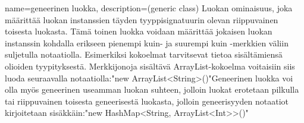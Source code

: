 {
	name=geneerinen luokka,
	description={(generic class) Luokan ominaisuus, joka määrittää luokan instanssien täyden
tyyppisignatuurin olevan riippuvainen toisesta luokasta. Tämä toinen luokka voidaan määrittää
jokaisen luokan instanssin kohdalla erikseen pienempi kuin- ja suurempi kuin -merkkien väliin
suljetulla notaatiolla. Esimerkiksi kokoelmat tarvitsevat tietoa sisältämiensä olioiden
tyypityksestä. Merkkijonoja sisältävä ArrayList-kokoelma voitaisiin siis luoda seuraavalla 
notaatiolla:\newline{}"new ArrayList<String>()"\newline{}Geneerinen luokka voi olla myös geneerinen useamman luokan suhteen, jolloin luokat erotetaan pilkulla tai riippuvainen toisesta
geneerisestä luokasta, jolloin geneerisyyden notaatiot kirjoitetaan
sisäkkäin:\newline{}"new HashMap<String, ArrayList<Int>>()"}
}